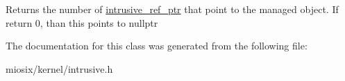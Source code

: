 \begin{DoxyReturn}{Returns}
the number of \hyperlink{classmiosix_1_1intrusive__ref__ptr}{intrusive\-\_\-ref\-\_\-ptr} that point to the managed object. If return 0, than this points to nullptr 
\end{DoxyReturn}


The documentation for this class was generated from the following file\-:\begin{DoxyCompactItemize}
\item 
miosix/kernel/intrusive.\-h\end{DoxyCompactItemize}
